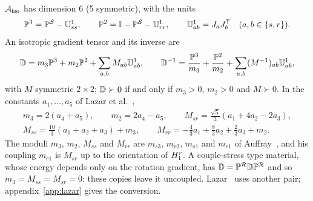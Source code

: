 $\mathcal{A}_{\mathrm{iso}}$ has dimension 6 (5 symmetric), with the units
\begin{equation}
\mathbb{P}^{3}=\mathbb{P}^{\mathcal S}-\mathbb{U}^{1}_{ss},\qquad \mathbb{P}^{2}=\mathbb{I}-\mathbb{P}^{\mathcal S}-\mathbb{U}^{1}_{rr},\qquad
\mathbb{U}^{1}_{ab}=J_{a}J_{b}^{\mathsf T}\quad(a,b\in\{s,r\}).\label{eq:iso-units}
\end{equation}
An isotropic gradient tensor and its inverse are
\begin{equation}
\mathbb{D}=m_3\mathbb{P}^{3}+m_2\mathbb{P}^{2}+\sum_{a,b}M_{ab}\mathbb{U}^{1}_{ab},\qquad
\mathbb{D}^{-1}=\frac{\mathbb{P}^{3}}{m_3}+\frac{\mathbb{P}^{2}}{m_2}+\sum_{a,b}(M^{-1})_{ab}\mathbb{U}^{1}_{ab},
\label{eq:iso-tensor}
\end{equation}
with $M$ symmetric $2\times2$; $\mathbb{D}\succ0$ if and only if $m_3>0$, $m_2>0$ and $M\succ0$.
In the constants $a_1,\dots,a_5$ of Lazar et al.~\cite[eqs.~(40) and (70)]{Lazar2022},
\begin{equation}
\begin{gathered}
m_3=2(a_4+a_5),\qquad m_2=2a_4-a_5,\qquad
M_{sr}=\tfrac{\sqrt5}{3}(a_1+4a_2-2a_3),\\
M_{ss}=\tfrac{10}{3}(a_1+a_2+a_3)+m_3,\qquad
M_{rr}=-\tfrac43a_1+\tfrac83a_2+\tfrac23a_3+m_2.
\end{gathered}\label{eq:iso-lazar}
\end{equation}
The moduli $m_3$, $m_2$, $M_{ss}$ and $M_{rr}$ are $m_{s3}$, $m_{r2}$, $m_{s1}$ and
$m_{r1}$ of Auffray~\cite[table~3]{Auffray2015}, and his coupling $m_{c1}$ is $M_{sr}$ up
to the orientation of $H_{1}^{r}$. A couple-stress type material, whose energy depends only
on the rotation gradient, has $\mathbb{D}=\mathbb{P}^{\mathcal R}\mathbb{D}\mathbb{P}^{\mathcal R}$ and so
$m_3=M_{ss}=M_{sr}=0$: these copies leave it uncoupled. Lazar~\cite{Lazar2016} uses
another pair; appendix~\ref{app:lazar} gives the conversion.
